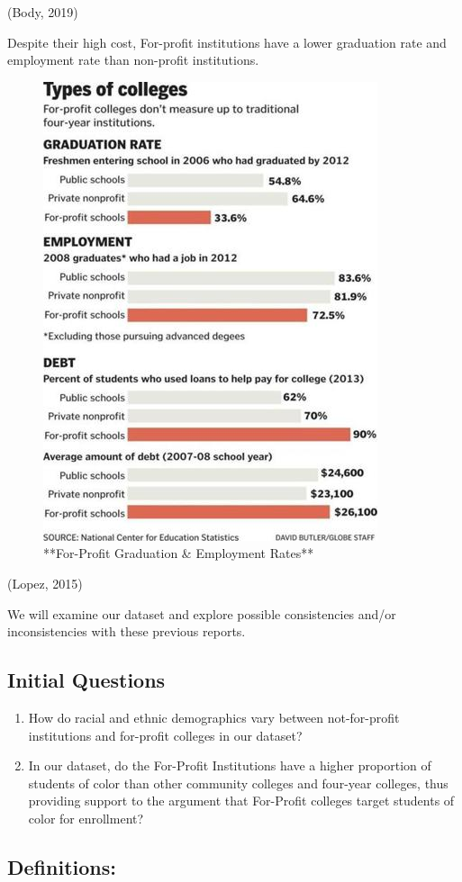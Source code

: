 \documentclass[
]{article}
\begin{document}
(Body, 2019)

Despite their high cost, For-profit institutions have a lower graduation
rate and employment rate than non-profit institutions.

\begin{figure}
\includegraphics[width=0.5\linewidth]{chart_3} \caption{**For-Profit Graduation & Employment Rates**}\label{fig:pressure4}
\end{figure}

(Lopez, 2015)

We will examine our dataset and explore possible consistencies and/or
inconsistencies with these previous reports.

\hypertarget{initial-questions}{%
\subsection{\texorpdfstring{\textbf{Initial
Questions}}{Initial Questions}}\label{initial-questions}}

\begin{enumerate}
\def\labelenumi{\arabic{enumi}.}
\item
  How do racial and ethnic demographics vary between not-for-profit
  institutions and for-profit colleges in our dataset?
\item
  In our dataset, do the For-Profit Institutions have a higher
  proportion of students of color than other community colleges and
  four-year colleges, thus providing support to the argument that
  For-Profit colleges target students of color for enrollment?
\end{enumerate}

\hypertarget{definitions}{%
\subsection{\texorpdfstring{\textbf{Definitions}:}{Definitions:}}\label{definitions}}
\end{document}
